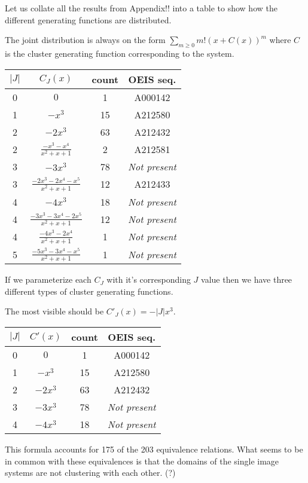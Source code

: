 \documentclass[openany, a4paper, 11pt, english]{article}
\theoremstyle{definition}
\begin{document}
Let us collate all the results from Appendix!! into a table to show how the
different generating functions are distributed.

The joint distribution is always on the form $\sum_{m \geq 0}m!(x+C(x))^m$ where $C$
is the cluster generating function corresponding to the system.

\begin{center}
\begin{tabular}{c|c|c|c}
    $|J|$ & $C_J(x)$ & count & OEIS seq. \\
    \hline
    0 & $0$ & 1 & A000142 \\
    1 & $-x^3$ & 15 & A212580 \\
    2 & $-2x^3$ & 63 & A212432 \\
    2 & $\frac{-x^3-x^4}{x^2+x+1}$ & 2 & A212581 \\
    3 & $-3x^3$ & 78 & \emph{Not present} \\
    3 & $\frac{-2x^3-2x^4-x^5}{x^2+x+1}$ & 12 & A212433 \\
    4 & $-4x^3$ & 18 & \emph{Not present} \\
    4 & $\frac{-3x^3-3x^4-2x^5}{x^2+x+1}$ & 12 & \emph{Not present}\\
    4 & $\frac{-4x^3-2x^4}{x^2+x+1}$ & 1 & \emph{Not present} \\ 
    5 & $\frac{-5x^3-3x^4-x^5}{x^2+x+1}$ & 1 & \emph{Not present}\\
\end{tabular}
\end{center}

If we parameterize each $C_J$ with it's corresponding $J$ value then we have
three different types of cluster generating functions.

The most visible should be $C'_J(x) = -|J|x^3$.
\begin{center}
\begin{tabular}{c|c|c|c}
    $|J|$ & $C'(x)$ & count & OEIS seq. \\
    \hline
    0 & $0$ & 1 & A000142 \\
    1 & $-x^3$ & 15 & A212580 \\
    2 & $-2x^3$ & 63 & A212432 \\
    3 & $-3x^3$ & 78 & \emph{Not present} \\
    4 & $-4x^3$ & 18 & \emph{Not present} \\
\end{tabular}
\end{center}
This formula accounts for 175 of the 203 equivalence relations.
What seems to be in common with these equivalences is that the domains of the
single image systems are not clustering with each other. (?)
\end{document}
